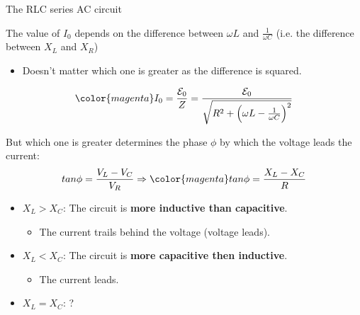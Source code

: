 %
%
%

\begin{frame}{The RLC series AC circuit}

The value of $I_0$ depends on the difference between
$\displaystyle \omega L$ and $\displaystyle \frac{1}{\omega C}$
(i.e. the difference between $X_L$ and $X_R$)
\begin{itemize}
  \item Doesn't matter which one is greater as the difference is squared.
\end{itemize}

\begin{equation*}
{\color{magenta}
        I_0 = \frac{\mathcal{E}_0}{Z} =
                 \frac{\mathcal{E}_0}{\sqrt{R^2 + \Big( \omega L - \frac{1}{\omega C} \Big)^2}}
}
\end{equation*}

But which one is greater determines the phase $\phi$
by which the voltage leads the current:
\begin{equation*}
     tan\phi = \frac{V_L - V_C}{V_R} \Rightarrow {\color{magenta}  tan\phi = \frac{X_L - X_C}{R} }
\end{equation*}

\begin{itemize}
  \item  {\color{magenta}  $X_L > X_C$}: The circuit is {\bf more inductive than capacitive}.
      \begin{itemize}
         \item The current trails behind the voltage (voltage leads).
      \end{itemize}
  \item  {\color{magenta}  $X_L < X_C$}: The circuit is {\bf more capacitive then inductive}.
      \begin{itemize}
         \item The current leads.
      \end{itemize}
  \item  {\color{magenta}  $X_L = X_C$}: ?
\end{itemize}


\end{frame}

%
%
%


